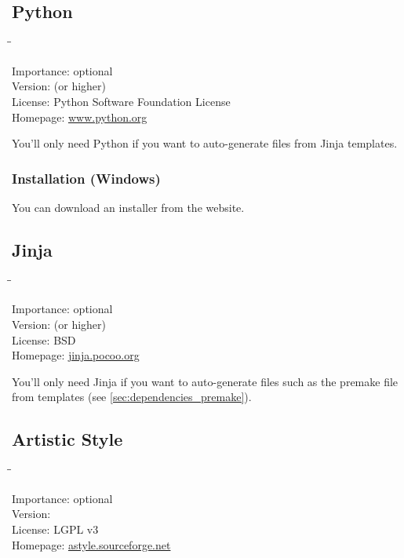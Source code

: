 \subsection{Python}

\begin{tabbing}
  \hspace*{6em}\=\=\kill

  Importance:  \> optional \\
  Version:      (or higher) \\
  License:     \> Python Software Foundation License \\
  Homepage:    \> \href{http://www.python.org/}{www.python.org}
\end{tabbing}

You'll only need Python if you want to auto-generate files from Jinja
templates.

\subsubsection{Installation (Windows)}

You can download an installer from the website.

\subsection{Jinja}

\begin{tabbing}
  \hspace*{6em}\=\=\kill

  Importance:  \> optional \\
  Version:      (or higher) \\
  License:     \> BSD \\
  Homepage:    \> \href{http://jinja.pocoo.org/}{jinja.pocoo.org}
\end{tabbing}

You'll only need Jinja if you want to auto-generate files such as the
premake file from templates (see \ref{sec:dependencies_premake}).

\subsection{Artistic Style}

\begin{tabbing}
  \hspace*{6em}\=\=\kill

  Importance:  \> optional \\
  Version:      \\
  License:     \> LGPL v3 \\
  Homepage:    \> \href{http://astyle.sourceforge.net/}{astyle.sourceforge.net}
\end{tabbing}

